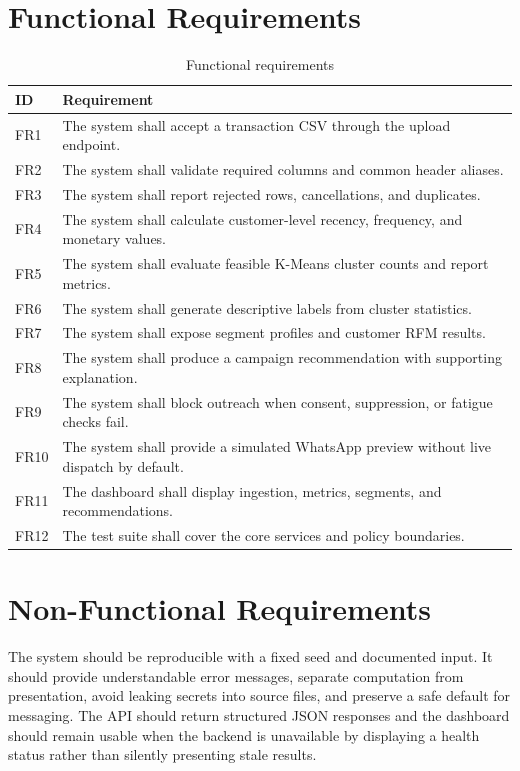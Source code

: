 \documentclass[12pt,a4paper]{report}
\begin{document}
\section{Functional Requirements}
\begin{longtable}{p{}p{}}
\caption{Functional requirements}\label{tab:functional}\\
\toprule
ID & Requirement\\\midrule
FR1 & The system shall accept a transaction CSV through the upload endpoint.\\
FR2 & The system shall validate required columns and common header aliases.\\
FR3 & The system shall report rejected rows, cancellations, and duplicates.\\
FR4 & The system shall calculate customer-level recency, frequency, and monetary values.\\
FR5 & The system shall evaluate feasible K-Means cluster counts and report metrics.\\
FR6 & The system shall generate descriptive labels from cluster statistics.\\
FR7 & The system shall expose segment profiles and customer RFM results.\\
FR8 & The system shall produce a campaign recommendation with supporting explanation.\\
FR9 & The system shall block outreach when consent, suppression, or fatigue checks fail.\\
FR10 & The system shall provide a simulated WhatsApp preview without live dispatch by default.\\
FR11 & The dashboard shall display ingestion, metrics, segments, and recommendations.\\
FR12 & The test suite shall cover the core services and policy boundaries.\\\bottomrule
\end{longtable}

\section{Non-Functional Requirements}
The system should be reproducible with a fixed seed and documented input. It should provide understandable error messages, separate computation from presentation, avoid leaking secrets into source files, and preserve a safe default for messaging. The API should return structured JSON responses and the dashboard should remain usable when the backend is unavailable by displaying a health status rather than silently presenting stale results.
\end{document}
